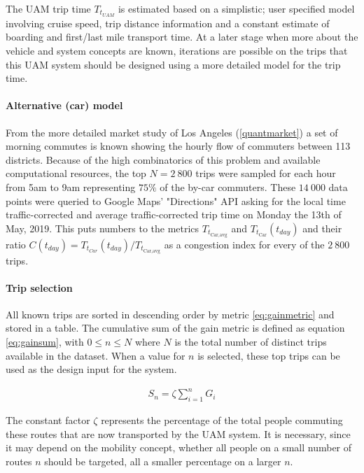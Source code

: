 The UAM trip time $T_{{t}_{UAM}}$ is estimated based on a simplistic; user specified model involving cruise speed, trip distance information and a constant estimate of boarding and first/last mile transport time. At a later stage when more about the vehicle and system concepts are known, iterations are possible on the trips that this UAM system should be designed using a more detailed model for the trip time.


\paragraph{Alternative (car) model}

From the more detailed market study of Los Angeles (\autoref{quantmarket}) a set of morning commutes is known showing the hourly flow of commuters between 113 districts. Because of the high combinatorics of this problem and available computational resources, the top $N = 2\ 800$ trips were sampled for each hour from 5am to 9am representing $75\%$ of the by-car commuters. These $14\ 000$ data points were queried to Google Maps' "Directions" API asking for the local time traffic-corrected and average traffic-corrected trip time on Monday the 13th of May, 2019. This puts numbers to the metrics $T_{t_\text{Car,avg}}$ and $T_{t_{\text{Car} }}(t_{day})$ and their ratio $C(t_{day}) = T_{t_{Car}}(t_{day}) / T_{t_\text{Car,avg}}$ as a congestion index for every of the $2\ 800$ trips.



\paragraph{Trip selection}
\label{subsec:tripselect}
All known trips are sorted in descending order by metric \ref{eq:gainmetric} and stored in a table. The cumulative sum of the gain metric is defined as equation \ref{eq:gainsum}, with $0\leq n\leq N$ where $N$ is the total number of distinct trips available in the dataset. When a value for $n$ is selected, these top trips can be used as the design input for the system.

\begin{align} \label{eq:gainsum}
    S_n = \zeta \sum_{i=1}^{n}{G_i}
\end{align}

The constant factor $\zeta$ represents the percentage of the total people commuting these routes that are now transported by the UAM system. It is necessary, since it may depend on the mobility concept, whether all people on a small number of routes $n$ should be targeted, all a smaller percentage on a larger $n$.

